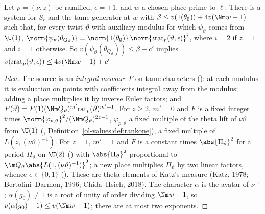 \begin{proposition}
\label{cg-selmer:prop:stickel}
Let $p=(\nu,z)$ be ramified, $\epsilon=\pm1$, and $w$ a chosen place prime to $\ell$. There is a system
for $S_\ell$ and the tame generator at $w$ with $\beta\le v(1(\theta_\emptyset))+4v(\Nm w-1)$ such
that, for every twist $\vartheta$ with auxiliary modulus for which $\psi_\vartheta$ comes from $\U(1)$,
$\norm{\psi_\vartheta(\theta_{Q_\vartheta})}=\norm{1(\theta_\emptyset)}\,\norm{\iota\mathrm{rat}_p(\vartheta,\epsilon)}^i$,
where $i=2$ if $z=1$ and $i=1$ otherwise. So $v(\psi_\vartheta(\theta_{Q_\vartheta}))\le\beta+c'$ implies $v(\iota\mathrm{rat}_p(\vartheta,\epsilon))\le
4v(\Nm w-1)+c'$.
\end{proposition}

\begin{proof}[Idea]
The source is an \emph{integral measure} $F$ on tame characters
(): at each modulus it is evaluation on points
with coefficients integral away from the modulus; adding a place multiplies it by inverse Euler
factors; and $F(\vartheta)=F(1)(\Nm Q_\vartheta)^{m'}\mathrm{rat}_p(\vartheta)^{m'+1}$. For $z\ge2$, $m'=0$ and
$F$ is a fixed integer times $\norm{\varphi_{p,\vartheta}}^2/(\Nm Q_\vartheta)^{2z-1}$, $\varphi_{p,\vartheta}$ a fixed multiple of
the theta lift of $\nu\vartheta$ from $\U(1)$ (,
Definition~\ref{ol-values:def:rankone}), a fixed multiple of $L(z,(\nu\vartheta)^{-1})$. For $z=1$, $m'=1$ and
$F$ is a constant times $\abs{\Pi_\vartheta}^2$ for a period $\Pi_\vartheta$ on $\U(2)$ ()
with $\abs{\Pi_\vartheta}^2$ proportional to $\Nm Q_\vartheta\abs{L(1,(\nu\vartheta)^{-1})}^2$; a new place
multiplies $\Pi_\vartheta$ by two linear factors, whence $e\in\{0,1\}$
(). These are theta elements of Katz's
measure (Katz, 1978; Bertolini--Darmon, 1996; Chida--Hsieh, 2018). The character $\alpha$ is the
avatar of $\nu^{-\epsilon}$; $\alpha(g_0)\ne1$ is a root of unity of order dividing $\Nm w-1$, so
$v(\alpha(g_0)-1)\le v(\Nm w-1)$; there are at most two exponents.
\end{proof}

